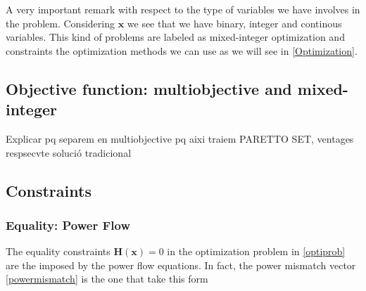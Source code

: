 \documentclass[a4paper,11pt, titlepage, twoside]{article}
\begin{document}
A very important remark with respect to the type of variables we have involves in the problem. Considering $\mathbf{x}$ we see that we have 
binary, integer and continous variables. This  kind of problems are labeled as mixed-integer optimization and constraints the optimization 
methods we can use as we will see in \ref{Optimization}.

\subsection{Objective function: multiobjective and mixed-integer}

Explicar pq separem en multiobjective pq aixi traiem PARETTO SET, ventages respsecvte solució tradicional
\subsection{Constraints}
\subsubsection{Equality: Power Flow}

The equality constraints $ \mathbf{H(x)} = 0$ in the optimization problem in \ref{optiprob} are the imposed by the power flow equations. In fact, the power mismatch vector \ref{powermismatch} is the one that take this form



\end{document}
